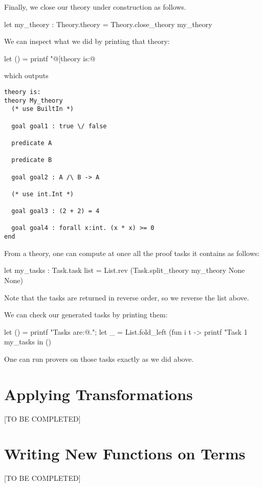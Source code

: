 Finally, we close our theory under construction as follows.
\begin{ocamlcode}
let my_theory : Theory.theory = Theory.close_theory my_theory
\end{ocamlcode}

We can inspect what we did by printing that theory:
\begin{ocamlcode}
let () = printf "@[theory is:@\n%
\end{ocamlcode}
which outputs
\begin{verbatim}
theory is:
theory My_theory
  (* use BuiltIn *)

  goal goal1 : true \/ false

  predicate A

  predicate B

  goal goal2 : A /\ B -> A

  (* use int.Int *)

  goal goal3 : (2 + 2) = 4

  goal goal4 : forall x:int. (x * x) >= 0
end
\end{verbatim}

From a theory, one can compute at once all the proof tasks it contains
as follows:
\begin{ocamlcode}
let my_tasks : Task.task list =
  List.rev (Task.split_theory my_theory None None)
\end{ocamlcode}
Note that the tasks are returned in reverse order, so we reverse the
list above.

We can check our generated tasks by printing them:
\begin{ocamlcode}
let () =
  printf "Tasks are:@.";
  let _ =
    List.fold_left
      (fun i t -> printf "Task %
      1 my_tasks
  in ()
\end{ocamlcode}

One can run provers on those tasks exactly as we did above.

\section{Applying Transformations}

[TO BE COMPLETED]

\section{Writing New Functions on Terms}

[TO BE COMPLETED]

